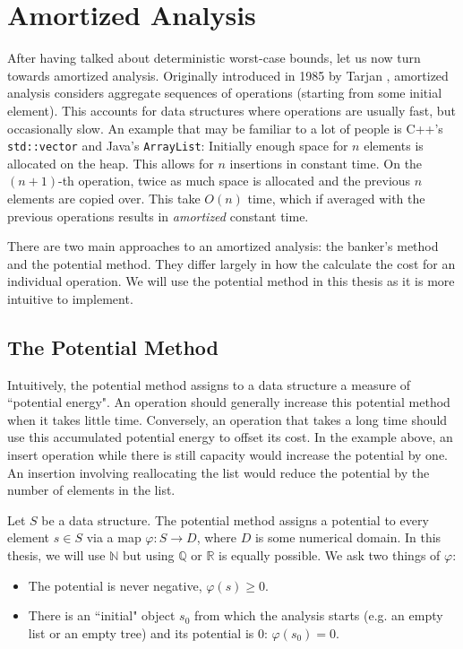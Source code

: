 
\chapter{Amortized Analysis}
\label{ch:amortized-analysis}
After having talked about deterministic worst-case bounds, let us now turn towards amortized analysis. Originally introduced in 1985 by Tarjan \cite{tarjan:1985:amortizedcc}, amortized analysis considers aggregate sequences of operations (starting from some initial element). This accounts for data structures where operations are usually fast, but occasionally slow. An example that may be familiar to a lot of people is C++'s \texttt{std::vector} and Java's \texttt{ArrayList}: Initially enough space for $n$ elements is allocated on the heap. This allows for $n$ insertions in constant time. On the $(n+1)$-th operation, twice as much space is allocated and the previous $n$ elements are copied over. This take $O(n)$ time, which if averaged with the previous operations results in \emph{amortized} constant time.

There are two main approaches to an amortized analysis: the banker's method and the potential method. They differ largely in how the calculate the cost for an individual operation. We will use the potential method in this thesis as it is more intuitive to implement.

\section{The Potential Method}
Intuitively, the potential method assigns to a data structure a measure of ``potential energy". An operation should generally increase this potential method when it takes little time. Conversely, an operation that takes a long time should use this accumulated potential energy to offset its cost. In the example above, an insert operation while there is still capacity would increase the potential by one. An insertion involving reallocating the list would reduce the potential by the number of elements in the list.

Let $S$ be a data structure. The potential method assigns a potential to every element $s \in S$ via a map $\varphi : S \rightarrow D$, where $D$ is some numerical domain. In this thesis, we will use $\mathbb N$ but using $\mathbb Q$ or $\mathbb R$ is equally possible. We ask two things of $\varphi$:

\newpage
\begin{itemize}
    \item The potential is never negative, $\varphi(s) \geq 0$.
    \item There is an ``initial" object $s_0$ from which the analysis starts (e.g. an empty list or an empty tree) and its potential is 0: $\varphi(s_0) = 0$.
\end{itemize}

